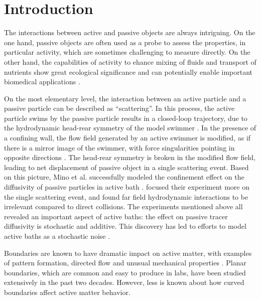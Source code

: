 \documentclass[%
10pt,
superscriptaddress,
twocolumn,
 amsmath,amssymb,
 aps,prx,
]{revtex4-2}
\begin{document}
\maketitle

\section{Introduction}
The interactions between active and passive objects are always intriguing.
On the one hand, passive objects are often used as a probe to assess the properties, in particular activity, which are sometimes challenging to measure directly.
On the other hand, the capabilities of activity to ehance mixing of fluids and transport of nutrients show great ecological significance and can potentially enable important biomedical applications \cite{Kurtuldu2011, Pushkin2013, Saintillan2008a, Sokolov2009a}.

On the most elementary level, the interaction between an active particle and a passive particle can be described as ``scattering''.
In this process, the active particle swims by the passive particle results in a closed-loop trajectory, due to the hydrodynamic head-rear symmetry of the model swimmer \cite{Dunkel2010}.
In the presence of a confining wall, the flow field generated by an active swimmer is modified, as if there is a mirror image of the swimmer, with force singularities pointing in opposite directions \cite{Blake1974}.
The head-rear symmetry is broken in the modified flow field, leading to net displacement of passive object in a single scattering event.
Based on this picture, Mino et al. successfully modeled the confinement effect on the diffusivity of passive particles in active bath \cite{Mino2011, Mino2013}.
\citet{Lagarde2020} focused their experiment more on the single scattering event, and found far field hydrodynamic interactions to be irrelevant compared to direct collisions.
The experiments mentioned above all revealed an important aspect of active baths: the effect on passive tracer diffusivity is stochastic and additive.
This discovery has led to efforts to model active baths as a stochastic noise \cite{Gregoire2001, Maggi2014, Wu2000, Ye2020}.

Boundaries are known to have dramatic impact on active matter, with examples of pattern formation, directed flow and unusual mechanical properties \cite{Wioland2013, Wu2017, Liu2019}.
Planar boundaries, which are common and easy to produce in labs, have been studied extensively in the past two decades.
However, less is known about how curved boundaries affect active matter behavior.
\end{document}
